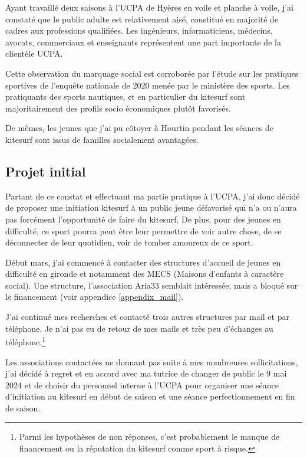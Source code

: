 \documentclass[11pt,a4paper]{report}
\begin{document}
Ayant travaillé deux saisons à l'UCPA de Hyères en voile
et planche à voile, j'ai  constaté que le public adulte est relativement
aisé, constitué en majorité de cadres aux professions qualifiées. Les
ingénieurs, informaticiens, médecins, avocats, commerciaux et enseignants
représentent une part importante de la clientèle UCPA.

Cette observation du marquage social  est corroborée par l'étude sur 
les pratiques sportives de l'enqu\^ete nationale de
2020 menée par le ministère des sports\cite{injep}. Les pratiquants
des sports nautiques, et en particulier du kitesurf sont majoritairement
des profils socio économiques plut\^ot favorisés.

De m\^emes, les jeunes que j'ai pu côtoyer à Hourtin
pendant les séances de kitesurf sont issus de
familles socialement avantagées.

\subsection{Projet initial}

Partant de ce constat et effectuant ma partie pratique à l'UCPA,
j'ai donc décidé de proposer une initiation kitesurf à un public jeune
défavorisé qui n'a ou n'aura pas forcément l'opportunité de faire du kitesurf. 
De plus, pour des jeunes en difficulté, ce sport pourra peut être 
leur permettre de voir autre chose, de se déconnecter de leur quotidien,
voir de tomber amoureux de ce sport.

Début mars, j'ai commencé à contacter des structures d'accueil de jeunes 
en difficulté en gironde et notamment des MECS (Maisons d'enfants à 
caractère social).
Une structure, l'association Aria33\cite{aria33} semblait 
intéressée, mais a bloqué sur le financement
(voir appendice \ref{appendix_mail}).

J'ai continué mes recherches et contacté trois autres structures
par mail et par téléphone. Je n'ai pas eu de retour de mes mails 
et très peu d'échanges au téléphone.\footnote{Parmi les hypothèses
de non réponses, c'est probablement le manque de financement ou
la réputation du kitesurf comme sport  à risque.}

Les associations contactées ne donnant pas  suite à mes nombreuses
sollicitations, j'ai décidé à regret et en accord avec ma tutrice
de changer de public le 9 mai 2024 et de choisir du personnel interne
à l'UCPA pour organiser une séance d'initiation au kitesurf en début 
de saison et une séance perfectionnement en fin de saison.
\end{document}
